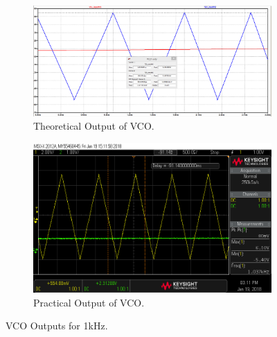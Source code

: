 \documentclass[paper]{IEEEtran}
\begin{document}
\begin{figure}[h!]
	\centering
	\begin{subfigure}{.48\textwidth}
		\centering
		\includegraphics[width=1\linewidth]{scope_28_SimResult}
		\caption{Theoretical Output of VCO.}
		\label{fig:VCOFor1kHzTheoretical}
	\end{subfigure}%
	\newline
	\begin{subfigure}{.48\textwidth}
		\centering
		\includegraphics[width=1\linewidth]{scope_28}
		\caption{Practical Output of VCO.}
		\label{fig:VCOFor1kHzPractical}
	\end{subfigure}
	\caption{VCO Outputs for 1kHz.}
	\label{fig:VCOFor1kHz}
\end{figure}
\end{document}
